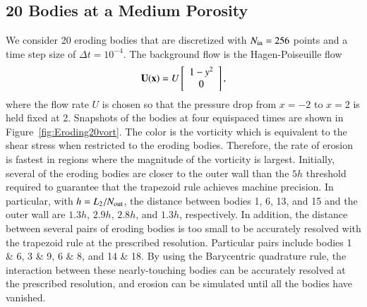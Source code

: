 \documentclass[preprint,10pt]{elsarticle}
\begin{document}
\subsection{20 Bodies at a Medium Porosity}
\label{sec:Eroding20}
We consider 20 eroding bodies that are discretized with $N_{\mathrm{in}}=256$
points and a time step size of $\Delta t = 10^{-4}$.  The background
flow is the Hagen-Poiseuille flow
\begin{align}
  {\mathbf{U}}({\mathbf{x}})=U \left[
  \begin{array}{c}
    1-y^2 \\ 0
  \end{array}
  \right],
\end{align}
where the flow rate $U$ is chosen so that the pressure drop from $x=-2$
to $x=2$ is held fixed at 2.  Snapshots of the bodies at four equispaced
times are shown in Figure~\ref{fig:Eroding20vort}.  The color is the
vorticity which is equivalent to the shear stress when restricted to the
eroding bodies.  Therefore, the rate of erosion is fastest in regions
where the magnitude of the vorticity is largest.  Initially, several of
the eroding bodies are closer to the outer wall than the $5h$ threshold
required to guarantee that the trapezoid rule achieves machine
precision.  In particular, with $h=L_2/N_{\mathrm{out}}$, the distance between
bodies 1, 6, 13, and 15 and the outer wall are $1.3h$, $2.9h$, $2.8h$,
and $1.3h$, respectively.  In addition, the distance between several
pairs of eroding bodies is too small to be accurately resolved with the
trapezoid rule at the prescribed resolution.  Particular pairs include
bodies 1 \& 6, 3 \& 9, 6 \& 8, and 14 \& 18.  By using the Barycentric
quadrature rule, the interaction between these nearly-touching bodies
can be accurately resolved at the prescribed resolution, and erosion can
be simulated until all the bodies have vanished.
\end{document}
